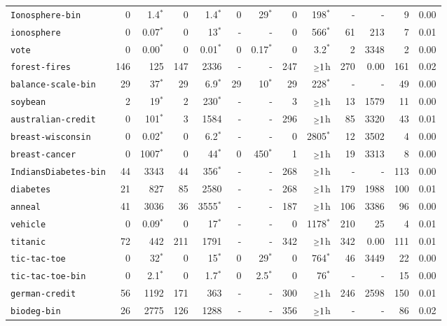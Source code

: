 \begin{tabular}{lrrrrrrrrrrrr}
\texttt{Ionosphere-bin} & 0 & 1.4$^*$ & 0 & 1.4$^*$ & 0 & 29$^*$ & 0 & 198$^*$ & - & - & 9 & 0.00\\
\texttt{ionosphere} & 0 & 0.07$^*$ & 0 & 13$^*$ & - & - & 0 & 566$^*$ & 61 & 213 & 7 & 0.01\\
\texttt{vote} & 0 & 0.00$^*$ & 0 & 0.01$^*$ & 0 & 0.17$^*$ & 0 & 3.2$^*$ & 2 & 3348 & 2 & 0.00\\
\texttt{forest-fires} & 146 & 125 & 147 & 2336 & - & - & 247 & $\mathsmaller{\geq}1$h & 270 & 0.00 & 161 & 0.02\\
\texttt{balance-scale-bin} & 29 & 37$^*$ & 29 & 6.9$^*$ & 29 & 10$^*$ & 29 & 228$^*$ & - & - & 49 & 0.00\\
\texttt{soybean} & 2 & 19$^*$ & 2 & 230$^*$ & - & - & 3 & $\mathsmaller{\geq}1$h & 13 & 1579 & 11 & 0.00\\
\texttt{australian-credit} & 0 & 101$^*$ & 3 & 1584 & - & - & 296 & $\mathsmaller{\geq}1$h & 85 & 3320 & 43 & 0.01\\
\texttt{breast-wisconsin} & 0 & 0.02$^*$ & 0 & 6.2$^*$ & - & - & 0 & 2805$^*$ & 12 & 3502 & 4 & 0.00\\
\texttt{breast-cancer} & 0 & 1007$^*$ & 0 & 44$^*$ & 0 & 450$^*$ & 1 & $\mathsmaller{\geq}1$h & 19 & 3313 & 8 & 0.00\\
\texttt{IndiansDiabetes-bin} & 44 & 3343 & 44 & 356$^*$ & - & - & 268 & $\mathsmaller{\geq}1$h & - & - & 113 & 0.00\\
\texttt{diabetes} & 21 & 827 & 85 & 2580 & - & - & 268 & $\mathsmaller{\geq}1$h & 179 & 1988 & 100 & 0.01\\
\texttt{anneal} & 41 & 3036 & 36 & 3555$^*$ & - & - & 187 & $\mathsmaller{\geq}1$h & 106 & 3386 & 96 & 0.00\\
\texttt{vehicle} & 0 & 0.09$^*$ & 0 & 17$^*$ & - & - & 0 & 1178$^*$ & 210 & 25 & 4 & 0.01\\
\texttt{titanic} & 72 & 442 & 211 & 1791 & - & - & 342 & $\mathsmaller{\geq}1$h & 342 & 0.00 & 111 & 0.01\\
\texttt{tic-tac-toe} & 0 & 32$^*$ & 0 & 15$^*$ & 0 & 29$^*$ & 0 & 764$^*$ & 46 & 3449 & 22 & 0.00\\
\texttt{tic-tac-toe-bin} & 0 & 2.1$^*$ & 0 & 1.7$^*$ & 0 & 2.5$^*$ & 0 & 76$^*$ & - & - & 15 & 0.00\\
\texttt{german-credit} & 56 & 1192 & 171 & 363 & - & - & 300 & $\mathsmaller{\geq}1$h & 246 & 2598 & 150 & 0.01\\
\texttt{biodeg-bin} & 26 & 2775 & 126 & 1288 & - & - & 356 & $\mathsmaller{\geq}1$h & - & - & 86 & 0.02\\

\end{tabular}
